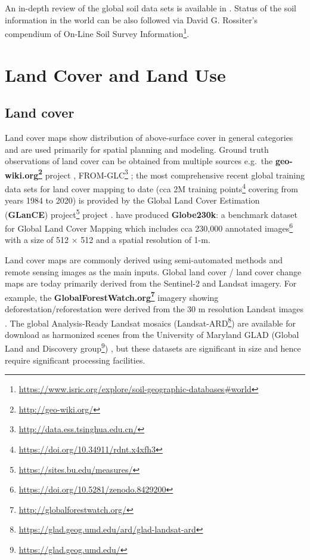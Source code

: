 \documentclass[
  graybox,natbib,nospthms]{svmono}
\renewcommand{\href}[2]{#2 (\url{#1})}
\renewcommand{\href}[2]{#2\footnote{\url{#1}}}
\begin{document}
An in-depth review of the global soil data sets is available in \citet{Dai2019}.
Status of the soil information in the world can be also followed via David G. Rossiter's \href{https://www.isric.org/explore/soil-geographic-databases\#world}{compendium of On-Line Soil Survey Information}.

\hypertarget{land-cover-and-land-use}{%
\section{Land Cover and Land Use}\label{land-cover-and-land-use}}

\hypertarget{land-cover}{%
\subsection{Land cover}\label{land-cover}}

Land cover maps show distribution of above-surface cover in general categories and
are used primarily for spatial planning and modeling. Ground truth observations of
land cover can be obtained from multiple sources e.g.~the \textbf{\href{http://geo-wiki.org/}{geo-wiki.org}}
project \citep{Fritz2017},
\href{http://data.ess.tsinghua.edu.cn/}{FROM-GLC} \citep{GONG2019370};
the most comprehensive recent global training data sets for land cover mapping to
date (cca \href{https://doi.org/10.34911/rdnt.x4xfh3}{2M training points} covering from years 1984 to 2020) is provided by the
\href{https://sites.bu.edu/measures/}{Global Land Cover Estimation (\textbf{GLanCE}) project} project \citep{Stanimirova2023}.
\citet{Shi2023} have produced \textbf{Globe230k}: a benchmark dataset for Global Land Cover Mapping
which includes \href{https://doi.org/10.5281/zenodo.8429200}{cca 230,000 annotated images} with a size of 512 × 512 and a spatial resolution of 1-m.

Land cover maps are commonly derived using semi-automated methods and remote sensing
images as the main inputs. Global land cover / land cover change maps are today primarily derived from the Sentinel-2
and Landsat imagery. For example, the \textbf{\href{http://globalforestwatch.org/}{GlobalForestWatch.org}}
imagery showing deforestation/reforestation were derived from the 30 m resolution Landsat
images \citep{hansen2013high}. The global Analysis-Ready Landsat mosaics (\href{https://glad.geog.umd.edu/ard/glad-landsat-ard}{Landsat-ARD})
are available for download as harmonized scenes from the University of Maryland GLAD (\href{https://glad.geog.umd.edu/}{Global Land and Discovery group}) \citep{rs12030426},
but these datasets are significant in size and hence require significant processing facilities.
\end{document}
